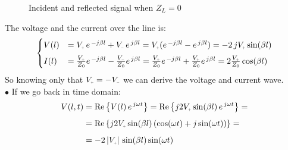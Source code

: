 \begin{figure}[H]
    \begin{center}
    \end{center}
    \caption{Incident and reflected signal when $Z_L=0$}\label{fig:signal_with_Z_0}
\end{figure}
The voltage and the current over the line is:
\begin{equation}
    \begin{cases}
      V(l)&=V\bottomPlus\,e^{\,-j\beta l}+V\bottomMinus\,e^{\,j\beta l}=V\bottomPlus(e^{\,-j\beta l}-e^{\,j\beta l})=-2\,jV\bottomPlus\sin (\beta l)\\[5pt]
      I(l)&=\frac{V\bottomPlus}{Z_0}e^{\,-j\beta l}-\frac{V\bottomMinus}{Z_0}e^{\,j\beta l}=\frac{V\bottomPlus}{Z_0}e^{\,-j\beta l}+\frac{V\bottomPlus}{Z_0}e^{\,j\beta l}=2\frac{V\bottomPlus}{Z_0}\cos (\beta l)
    \end{cases}
\end{equation}
So knowing only that $V\bottomPlus=-V\bottomMinus$ we can derive the voltage and current wave.\\
$\bullet$ If we go back in time domain:
\begin{align}
    \begin{split}
      V(l,t)&=\operatorname{Re}\left\{V(l)\,e^{\,j\omega t}\right\}=\operatorname{Re}\left\{j 2V\bottomPlus\sin (\beta l)\,e^{\,j\omega t}\right\}=\\[5pt]
      &=\operatorname{Re}\left\{j2V\bottomPlus\sin(\beta l)\,(\cos(\omega t)+j\sin(\omega t))\right\}=\\[5pt]
      &=-2\,|V\bottomPlus|\,\sin(\beta l)\sin(\omega t)
    \end{split}
\end{align}
